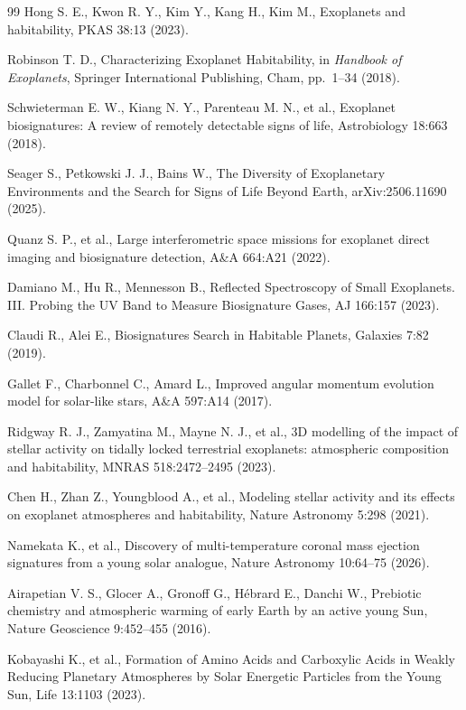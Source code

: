 \begin{thebibliography}{99}
Hong S. E., Kwon R. Y., Kim Y., Kang H., Kim M., Exoplanets and habitability, PKAS 38:13 (2023).

Robinson T. D., Characterizing Exoplanet Habitability, in \textit{Handbook of Exoplanets}, Springer International Publishing, Cham, pp.~1--34 (2018).

Schwieterman E. W., Kiang N. Y., Parenteau M. N., et al., Exoplanet biosignatures: A review of remotely detectable signs of life, Astrobiology 18:663 (2018).

Seager S., Petkowski J. J., Bains W., The Diversity of Exoplanetary Environments and the Search for Signs of Life Beyond Earth, arXiv:2506.11690 (2025).

Quanz S. P., et al., Large interferometric space missions for exoplanet direct imaging and biosignature detection, A\&A 664:A21 (2022).

Damiano M., Hu R., Mennesson B., Reflected Spectroscopy of Small Exoplanets. III. Probing the UV Band to Measure Biosignature Gases, AJ 166:157 (2023).

Claudi R., Alei E., Biosignatures Search in Habitable Planets, Galaxies 7:82 (2019).

Gallet F., Charbonnel C., Amard L., Improved angular momentum evolution model for solar-like stars, A\&A 597:A14 (2017).

Ridgway R. J., Zamyatina M., Mayne N. J., et al., 3D modelling of the impact of stellar activity on tidally locked terrestrial exoplanets: atmospheric composition and habitability, MNRAS 518:2472--2495 (2023).

Chen H., Zhan Z., Youngblood A., et al., Modeling stellar activity and its effects on exoplanet atmospheres and habitability, Nature Astronomy 5:298 (2021).

Namekata K., et al., Discovery of multi-temperature coronal mass ejection signatures from a young solar analogue, Nature Astronomy 10:64--75 (2026).

Airapetian V. S., Glocer A., Gronoff G., H\'ebrard E., Danchi W., Prebiotic chemistry and atmospheric warming of early Earth by an active young Sun, Nature Geoscience 9:452--455 (2016).

Kobayashi K., et al., Formation of Amino Acids and Carboxylic Acids in Weakly Reducing Planetary Atmospheres by Solar Energetic Particles from the Young Sun, Life 13:1103 (2023).


\end{thebibliography}
